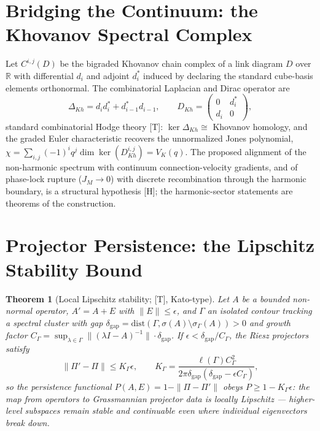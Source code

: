 \documentclass[11pt]{article}
\theoremstyle{definition}
\theoremstyle{plain}
\newtheorem{theorem}[definition]{Theorem}
\begin{document}
\section{Bridging the Continuum: the Khovanov Spectral Complex}

Let $C^{i,j}(D)$ be the bigraded Khovanov chain complex of a link diagram $D$ over
$\mathbb{R}$ with differential $d_i$ and adjoint $d_i^*$ induced by declaring the
standard cube-basis elements orthonormal. The combinatorial Laplacian and Dirac
operator are
\begin{equation}
\Delta_{Kh} = d_i d_i^* + d_{i-1}^* d_{i-1}, \qquad
D_{Kh} = \begin{pmatrix} 0 & d_i^* \\ d_i & 0 \end{pmatrix},
\end{equation}
standard combinatorial Hodge theory [T]: $\ker\Delta_{Kh} \cong$ Khovanov homology,
and the graded Euler characteristic recovers the unnormalized Jones polynomial,
$\chi = \sum_{i,j}(-1)^i q^j \dim\ker(D^{i,j}_{Kh}) = V_K(q)$. The proposed
alignment of the non-harmonic spectrum with continuum connection-velocity
gradients, and of phase-lock rupture ($J_M \to 0$) with discrete recombination
through the harmonic boundary, is a structural hypothesis [H]; the harmonic-sector
statements are theorems of the construction.

\section{Projector Persistence: the Lipschitz Stability Bound}

\begin{theorem}[Local Lipschitz stability; {[T]}, Kato-type]
Let $A$ be a bounded non-normal operator, $A' = A + E$ with $\|E\| \le \epsilon$,
and $\Gamma$ an isolated contour tracking a spectral cluster with gap
$\delta_{\mathrm{gap}} = \mathrm{dist}(\Gamma, \sigma(A)\setminus\sigma_\Gamma(A))
> 0$ and growth factor $C_\Gamma = \sup_{\lambda\in\Gamma}\|(\lambda I - A)^{-1}\|
\cdot \delta_{\mathrm{gap}}$. If $\epsilon < \delta_{\mathrm{gap}}/C_\Gamma$, the
Riesz projectors satisfy
\begin{equation}
\|\Pi' - \Pi\| \le K_\Gamma \epsilon, \qquad
K_\Gamma = \frac{\ell(\Gamma)C_\Gamma^2}
{2\pi\delta_{\mathrm{gap}}(\delta_{\mathrm{gap}} - \epsilon C_\Gamma)},
\end{equation}
so the persistence functional $P(A,E) = 1 - \|\Pi - \Pi'\|$ obeys
$P \ge 1 - K_\Gamma\epsilon$: the map from operators to Grassmannian projector data
is locally Lipschitz --- higher-level subspaces remain stable and continuable even
where individual eigenvectors break down.
\end{theorem}
\end{document}

